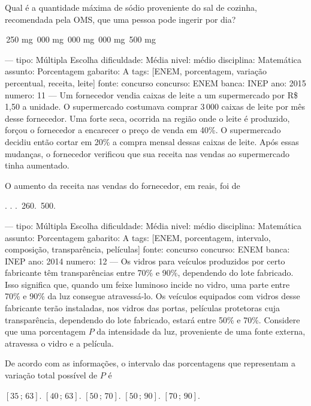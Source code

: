 Qual é a quantidade máxima de sódio proveniente do sal de cozinha, recomendada pela OMS, que uma pessoa pode ingerir por dia?
\begin{choices}
\,250 mg
\,000 mg
\,000 mg
\,000 mg
\,500 mg
\end{choices}

---
tipo: Múltipla Escolha
dificuldade: Média
nivel: médio
disciplina: Matemática
assunto: Porcentagem
gabarito: A
tags: [ENEM, porcentagem, variação percentual, receita, leite]
fonte: concurso
concurso: ENEM
banca: INEP
ano: 2015
numero: 11
---
\question
Um fornecedor vendia caixas de leite a um supermercado por R\$ 1,50 a unidade. O supermercado costumava comprar 3\,000 caixas de leite por mês desse fornecedor. Uma forte seca, ocorrida na região onde o leite é produzido, forçou o fornecedor a encarecer o preço de venda em 40\%. O supermercado decidiu então cortar em 20\% a compra mensal dessas caixas de leite. Após essas mudanças, o fornecedor verificou que sua receita nas vendas ao supermercado tinha aumentado.

O aumento da receita nas vendas do fornecedor, em reais, foi de
\begin{choices}
.
.
.
\,260.
\,500.
\end{choices}

---
tipo: Múltipla Escolha
dificuldade: Média
nivel: médio
disciplina: Matemática
assunto: Porcentagem
gabarito: A
tags: [ENEM, porcentagem, intervalo, composição, transparência, películas]
fonte: concurso
concurso: ENEM
banca: INEP
ano: 2014
numero: 12
---
\question
Os vidros para veículos produzidos por certo fabricante têm transparências entre 70\% e 90\%, dependendo do lote fabricado. Isso significa que, quando um feixe luminoso incide no vidro, uma parte entre 70\% e 90\% da luz consegue atravessá-lo. Os veículos equipados com vidros desse fabricante terão instaladas, nos vidros das portas, películas protetoras cuja transparência, dependendo do lote fabricado, estará entre 50\% e 70\%. Considere que uma porcentagem $P$ da intensidade da luz, proveniente de uma fonte externa, atravessa o vidro e a película.

De acordo com as informações, o intervalo das porcentagens que representam a variação total possível de $P$ é
\begin{choices}
\CorrectChoice $[35\,;\,63]$.
\choice $[40\,;\,63]$.
\choice $[50\,;\,70]$.
\choice $[50\,;\,90]$.
\choice $[70\,;\,90]$.
\end{choices}

